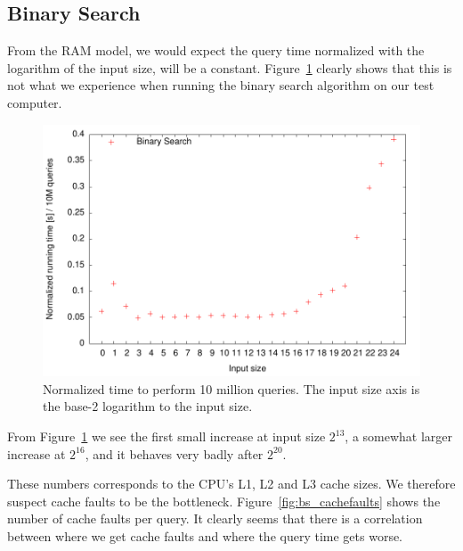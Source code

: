 \subsection{Binary Search}
From the RAM model, we would expect the query time normalized with the
logarithm of the input size, will be a
constant. Figure~\ref{fig:bs_runningtime} clearly shows that this is
not what we experience when running the binary search algorithm on our
test computer.

\begin{figure}[h!]
  \label{fig:bs_runningtime}
  \centering
  \includegraphics[width=\textwidth]{../week1/plots/outputs/bs_runningtime}
  \caption{Normalized time to perform 10 million queries. The input
    size axis is the base-2 logarithm to the input size.}
\end{figure}

From Figure~\ref{fig:bs_runningtime} we see the first small increase
at input size \(2^{13}\), a somewhat larger increase at \(2^{16}\),
and it behaves very badly after \(2^{20}\).

These numbers corresponds to the CPU's L1, L2 and L3 cache sizes. We
therefore suspect cache faults to be the
bottleneck. Figure~\ref{fig:bs_cachefaults} shows the number of cache
faults per query. It clearly seems that there is a correlation between
where we get cache faults and where the query time gets worse.

